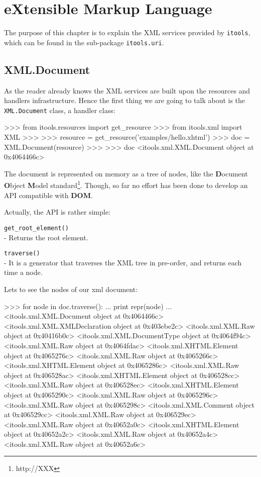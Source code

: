 \chapter{eXtensible Markup Language}

The purpose of this chapter is to explain the XML services provided by
{\tt itools}, which can be found in the sub-package {\tt itools.uri}.

\section{XML.Document}

As the reader already knows the XML services are built upon the resources
and handlers infrastructure. Hence the first thing we are going to talk
about is the {\tt XML.Document} class, a handler class:

\begin{code}
    >>> from itools.resources import get_resource
    >>> from itools.xml import XML
    >>>
    >>> resource = get_resource('examples/hello.xhtml')
    >>> doc = XML.Document(resource)
    >>>
    >>> doc
    <itools.xml.XML.Document object at 0x4064466c>
\end{code}

The document is represented on memory as a tree of nodes, like the
{\bf D}ocument {\bf O}bject {\bf M}odel standard\footnote{http://XXX}.
Though, so far no effort has been done to develop an API compatible with
{\bf DOM}.

Actually, the API is rather simple:

\begin{api}
    {\tt get\_root\_element()}\\
    - Returns the root element.

    {\tt traverse()}\\
    - It is a generator that traverses the XML tree in pre-order, and returns
    each time a node.
\end{api}

Lets to see the nodes of our xml document:

\begin{code}
    >>> for node in doc.traverse():
    ...     print repr(node)
    ... 
    <itools.xml.XML.Document object at 0x4064466c>
    <itools.xml.XML.XMLDeclaration object at 0x403ebe2c>
    <itools.xml.XML.Raw object at 0x40416b0c>
    <itools.xml.XML.DocumentType object at 0x4064f94c>
    <itools.xml.XML.Raw object at 0x4064fdac>
    <itools.xml.XHTML.Element object at 0x4065276c>
    <itools.xml.XML.Raw object at 0x4065266c>
    <itools.xml.XHTML.Element object at 0x4065286c>
    <itools.xml.XML.Raw object at 0x406528ac>
    <itools.xml.XHTML.Element object at 0x406528cc>
    <itools.xml.XML.Raw object at 0x406528ec>
    <itools.xml.XHTML.Element object at 0x4065290c>
    <itools.xml.XML.Raw object at 0x4065296c>
    <itools.xml.XML.Raw object at 0x4065298c>
    <itools.xml.XML.Comment object at 0x406529cc>
    <itools.xml.XML.Raw object at 0x406529ec>
    <itools.xml.XML.Raw object at 0x40652a0c>
    <itools.xml.XHTML.Element object at 0x40652a2c>
    <itools.xml.XML.Raw object at 0x40652a4c>
    <itools.xml.XML.Raw object at 0x40652a6c>
\end{code}